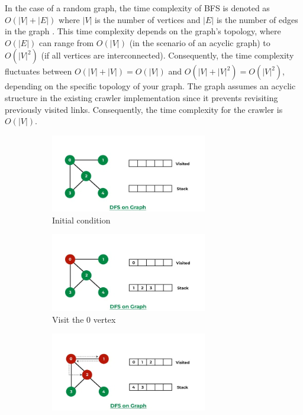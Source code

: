 In the case of a random graph, the time complexity of BFS is denoted as $O(|V|+|E|)$ where $|V|$ is the number of vertices and $|E|$ is the number of edges in the graph \cite{cormen01introduction}. This time complexity depends on the graph's topology, where $O(|E|)$ can range from $O(|V|)$ (in the scenario of an acyclic graph) to $O(|V|^2)$ (if all vertices are interconnected). Consequently, the time complexity fluctuates between $O(|V| + |V|) = O(|V|)$ and $O(|V| + |V|^2) = O(|V|^2)$, depending on the specific topology of your graph. The graph assumes an acyclic structure in the existing crawler implementation since it prevents revisiting previously visited links. Consequently, the time complexity for the crawler is $O(|V|)$.
\begin{figure}[ht] 
  \begin{subfigure}[b]{0.5\textwidth}
    \centering
    \includegraphics[width=0.75\textwidth]{figures/dfs-1.png} 
    \caption{Initial condition} 
    \label{fig7:a} 
    \vspace{4ex}
  \end{subfigure}%
  \begin{subfigure}[b]{0.5\textwidth}
    \centering
    \includegraphics[width=0.75\textwidth]{figures/dfs-2.png} 
    \caption{Visit the 0 vertex}  
    \label{fig7:b} 
    \vspace{4ex}
  \end{subfigure} 
  \begin{subfigure}[b]{0.5\textwidth}
    \centering
    \includegraphics[width=0.75\textwidth]{figures/dfs-3.png} 

\end{subfigure}
\end{figure}
